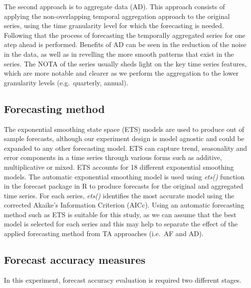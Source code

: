 \documentclass[]{elsarticle} %
\begin{document}
The second approach is to aggregate data (AD). This approach consists of
applying the non-overlapping temporal aggregation approach to the
original series, using the time granularity level for which the
forecasting is needed. Following that the process of forecasting the
temporally aggregated series for one atep ahead is performed. Benefits
of AD can be seen in the reduction of the noise in the data, as well as
in revelling the more smooth patterns that exist in the series. The NOTA
of the series usually sheds light on the key time series features, which
are more notable and clearer as we perform the aggregation to the lower
granularity levels (e.g.~quarterly, annual).

\hypertarget{forecasting-method}{%
\subsection{Forecasting method}\label{forecasting-method}}

The exponential smoothing state space (ETS) models
\citep{hyndman2021forecasting} are used to produce out of sample
forecasts, although our experiment design is model agnostic and could be
expanded to any other forecasting model. ETS can capture trend,
seasonality and error components in a time series through various forms
such as additive, multiplicative or mixed. ETS accounts for 18 different
exponential smoothing models. The automatic exponential smoothing model
is used using \emph{ets()} function in the forecast package
\citep{hyndman2008automatic} in R to produce forecasts for the original
and aggregated time series. For each series, \emph{ets()} identifies the
most accurate model using the corrected Akaike's Information Criterion
(AICc). Using an automatic forecasting method such as ETS is suitable
for this study, as we can assume that the best model is selected for
each series and this may help to separate the effect of the applied
forecasting method from TA approaches (i.e.~AF and AD).

\hypertarget{errormetric}{%
\subsection{Forecast accuracy measures}\label{errormetric}}

In this experiment, forecast accuracy evaluation is required two
different stages.
\end{document}
